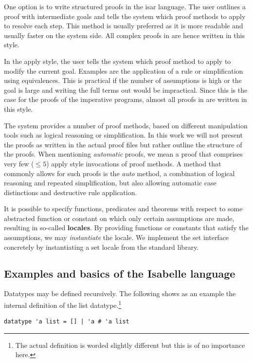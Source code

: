 One option is to write structured proofs in the isar language.
The user outlines a proof with intermediate goals
and tells the system which proof methods to apply to
resolve each step.
This method is usually preferred as it is more readable and usually
faster on the system side.
All complex proofs in  are hence written in this style.

In the apply style, the user tells the system which proof method
to apply to modify the current goal.
Examples are the application of a rule
or simplification using equivalences.
This is practical if the number of assumptions
is high or the goal is large and writing the full terms
out would be impractical.
Since this is the case for the proofs of the imperative programs,
almost all proofs in  are written in this style.

The system provides a number of proof methods,
based on different manipulation tools
such as logical reasoning or simplification.
In this work we will not present the proofs as written in the actual
proof files but rather outline the structure of the proofs.
When mentioning \textit{automatic} proofs, we mean a proof that
comprises very few ($\le 5$) apply style
invocations of proof methods.
A method that commonly allows for such proofs is the \textit{auto} method,
a combination of logical reasoning and repeated simplification,
but also allowing automatic case distinctions and destructive rule application.

It is possible to specify functions, predicates
and theorems with respect to some abstracted function or constant
on which only certain assumptions are made,
resulting in so-called \textbf{locales}.
By providing functions or constants that satisfy
the assumptions, we may \textit{instantiate}
the locale.
We implement the set interface concretely by
instantiating a set locale from the standard library.

\subsection{Examples and basics of the Isabelle language}

Datatypes may be defined recursively.
The following shows as an example the internal definition of the list datatype.\footnote{
    The actual definition is worded slightly different but this is of no importance here.
}

\begin{lstlisting}[mathescape=true, language=Isabelle,label=lst:list-def]
datatype 'a list = [] | 'a # 'a list
\end{lstlisting}

